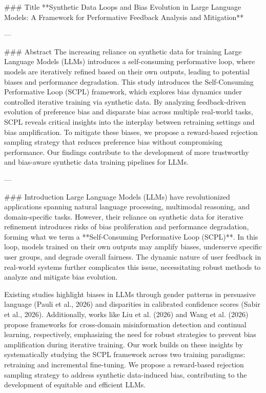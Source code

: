 ### Title  
**Synthetic Data Loops and Bias Evolution in Large Language Models: A Framework for Performative Feedback Analysis and Mitigation**

---

### Abstract  
The increasing reliance on synthetic data for training Large Language Models (LLMs) introduces a self-consuming performative loop, where models are iteratively refined based on their own outputs, leading to potential biases and performance degradation. This study introduces the Self-Consuming Performative Loop (SCPL) framework, which explores bias dynamics under controlled iterative training via synthetic data. By analyzing feedback-driven evolution of preference bias and disparate bias across multiple real-world tasks, SCPL reveals critical insights into the interplay between retraining settings and bias amplification. To mitigate these biases, we propose a reward-based rejection sampling strategy that reduces preference bias without compromising performance. Our findings contribute to the development of more trustworthy and bias-aware synthetic data training pipelines for LLMs.

---

### Introduction  
Large Language Models (LLMs) have revolutionized applications spanning natural language processing, multimodal reasoning, and domain-specific tasks. However, their reliance on synthetic data for iterative refinement introduces risks of bias proliferation and performance degradation, forming what we term a **Self-Consuming Performative Loop (SCPL)**. In this loop, models trained on their own outputs may amplify biases, underserve specific user groups, and degrade overall fairness. The dynamic nature of user feedback in real-world systems further complicates this issue, necessitating robust methods to analyze and mitigate bias evolution.

Existing studies highlight biases in LLMs through gender patterns in persuasive language (Pauli et al., 2026) and disparities in calibrated confidence scores (Sabir et al., 2026). Additionally, works like Liu et al. (2026) and Wang et al. (2026) propose frameworks for cross-domain misinformation detection and continual learning, respectively, emphasizing the need for robust strategies to prevent bias amplification during iterative training. Our work builds on these insights by systematically studying the SCPL framework across two training paradigms: retraining and incremental fine-tuning. We propose a reward-based rejection sampling strategy to address synthetic data-induced bias, contributing to the development of equitable and efficient LLMs.

